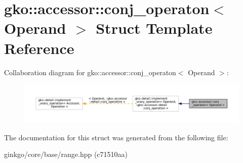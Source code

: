 \hypertarget{structgko_1_1accessor_1_1conj__operaton}{}\section{gko\+:\+:accessor\+:\+:conj\+\_\+operaton$<$ Operand $>$ Struct Template Reference}
\label{structgko_1_1accessor_1_1conj__operaton}


Collaboration diagram for gko\+:\+:accessor\+:\+:conj\+\_\+operaton$<$ Operand $>$\+:
\nopagebreak
\begin{figure}[H]
\begin{center}
\leavevmode
\includegraphics[width=350pt]{structgko_1_1accessor_1_1conj__operaton__coll__graph}
\end{center}
\end{figure}


The documentation for this struct was generated from the following file\+:\begin{DoxyCompactItemize}
\item 
ginkgo/core/base/range.\+hpp (c71510aa)\end{DoxyCompactItemize}
